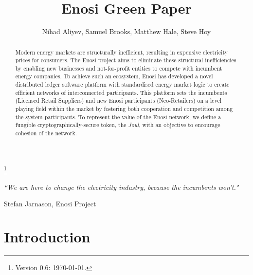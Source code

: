 \documentclass[a4paper,12pt,reqno]{amsart}
\theoremstyle{definition}
\begin{document}
\title[]{Enosi Green Paper}
\thanks{Version 0.6: \today.}

\author[]
{Nihad Aliyev, Samuel Brooks, Matthew Hale, Steve Hoy}


\maketitle


\begin{abstract}\small
Modern energy markets are structurally inefficient, resulting in expensive electricity prices for consumers. The Enosi project aims to eliminate these structural inefficiencies by enabling new businesses and not-for-profit entities to compete with incumbent energy companies. To achieve such an ecosystem, Enosi has developed a novel distributed ledger software platform with standardised energy market logic to create efficient networks of interconnected participants. This platform sets the incumbents (Licensed Retail Suppliers) and new Enosi participants (Neo-Retailers) on a level playing field within the market by fostering both cooperation and competition among the system participants. To represent the value of the Enosi network, we define a fungible cryptographically-secure token, the \textit{Joul}, with an objective to encourage cohesion of the network.
\end{abstract}




\newpage




%
%
%



%
%

%
%

\textit{``We are here to change the electricity industry, because the incumbents won't."} 

\hfill{Stefan Jarnason, Enosi Project}

\section{Introduction}
\end{document}
